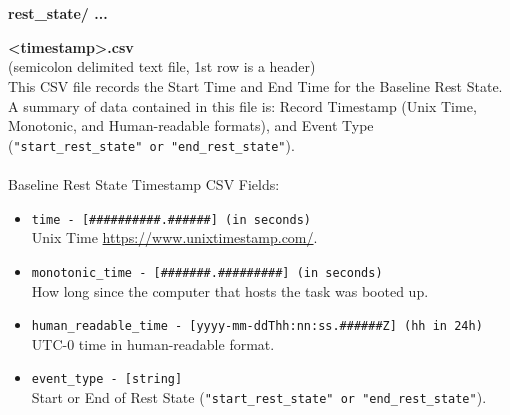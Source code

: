 \begin{description}
\begin{addmargin}[0em]{0em}
    \end{addmargin} %


    \textbf{\\\\}
    \begin{addmargin}[0em]{0em} %
        \textbf{rest\_state/ ...}

        \begin{addmargin}[1em]{0em} %
            \label{rest_state/<timestamp>.csv}
            \textbf{<timestamp>.csv}\\(semicolon delimited text file, 1st row is a header)\\
            This CSV file records the Start Time and End Time for the Baseline Rest State.
            A summary of data contained in this file is: Record Timestamp (Unix Time, Monotonic, and Human-readable formats),
            and Event Type (\verb|"start_rest_state" or "end_rest_state"|).\\\\
            Baseline Rest State Timestamp CSV Fields:
            \begin{itemize}
                \item \verb|time - [##########.######] (in seconds)|\\Unix Time \href{https://www.unixtimestamp.com/}{https://www.unixtimestamp.com/}.
                \item \verb|monotonic_time - [#######.#########] (in seconds)|\\How long since the computer that hosts the task was booted up.
                \item \verb|human_readable_time - [yyyy-mm-ddThh:nn:ss.######Z] (hh in 24h)|\\UTC-0 time in human-readable format.
                \item \verb|event_type - [string]|\\Start or End of Rest State (\verb|"start_rest_state" or "end_rest_state"|).
            \end{itemize}
        \end{addmargin} %

    \end{addmargin} %
    




\end{description}
